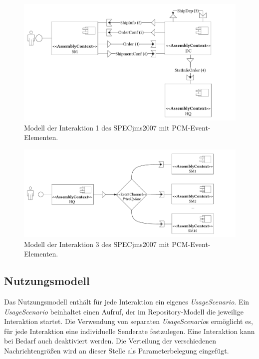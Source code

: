\begin{figure}
\center
  \includegraphics[width=1\textwidth]{images/evaluation/specjms/evaluationInteraktion1events.pdf}
  \caption{Modell der Interaktion 1 des SPECjms2007 mit PCM-Event-Elementen.}
  \label{img:interaction1system}
\end{figure}

\begin{figure}
\center
  \includegraphics[width=1\textwidth]{images/evaluation/specjms/evaluationInteraktion3events.pdf}
  \caption{Modell der Interaktion 3 des SPECjms2007 mit PCM-Event-Elementen.}
  \label{img:interaction3system}
\end{figure}


\subsection{Nutzungsmodell}
Das Nutzungsmodell enthält für jede Interaktion ein eigenes \emph{UsageScenario}. Ein \emph{UsageScenario} beinhaltet einen Aufruf, der im Repository-Modell die jeweilige Interaktion startet. Die Verwendung von separaten \emph{UsageScenario}s ermöglicht es, für jede Interaktion eine individuelle Senderate festzulegen. Eine Interaktion kann bei Bedarf auch deaktiviert werden. Die Verteilung der verschiedenen Nachrichtengrößen wird an dieser Stelle als Parameterbelegung eingefügt.


